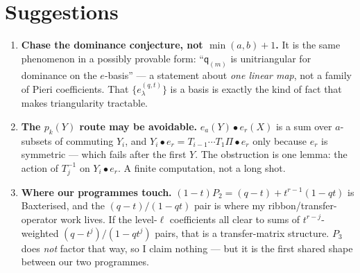 \documentclass[11pt,a4paper]{article}
\begin{document}
\section{Suggestions}
\begin{enumerate}\itemsep2pt
\item \textbf{Chase the dominance conjecture, not $\min(a,b)+1$.} It is the same
phenomenon in a possibly provable form: ``$\mathsf q_{(m)}$ is unitriangular for
dominance on the $e$-basis'' --- a statement about \emph{one linear map}, not a family
of Pieri coefficients. That $\{e^{(q,t)}_\lambda\}$ is a basis is exactly the kind of
fact that makes triangularity tractable.
\item \textbf{The $p_k(Y)$ route may be avoidable.} $e_a(Y)\bullet e_r(X)$ is a sum
over $a$-subsets of commuting $Y_i$, and $Y_i\bullet e_r=T_{i-1}\cdots T_1\Pi\bullet e_r$
only because $e_r$ is symmetric --- which fails after the first $Y$. The obstruction
is one lemma: the action of $T_j^{-1}$ on $Y_i\bullet e_r$. A finite computation, not
a long shot.
\item \textbf{Where our programmes touch.} $(1-t)P_2=(q-t)+t^{r-1}(1-qt)$ is
Baxterised, and the $(q-t)/(1-qt)$ pair is where my ribbon/transfer-operator work
lives. If the level-$\ell$ coefficients all clear to sums of $t^{r-j}$-weighted
$(q-t^j)/(1-qt^j)$ pairs, that is a transfer-matrix structure. $P_3$ does
\emph{not} factor that way, so I claim nothing --- but it is the first shared shape
between our two programmes.
\end{enumerate}
\end{document}
